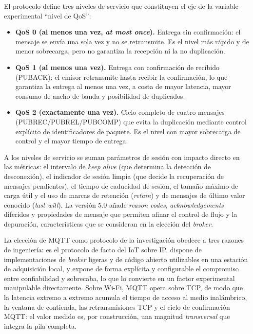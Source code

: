 \documentclass[
  12pt,
]{article}
\providecommand{\tightlist}{%
  \setlength{\itemsep}{0pt}\setlength{\parskip}{0pt}}
\begin{document}
El protocolo define tres niveles de servicio que constituyen el eje de
la variable experimental “nivel de QoS”:

\begin{itemize}
\tightlist
\item
  \textbf{QoS 0 (al menos una vez, \emph{at most once}).} Entrega sin
  confirmación: el mensaje se envía una sola vez y no se retransmite. Es
  el nivel más rápido y de menor sobrecarga, pero no garantiza la
  recepción ni la no duplicación.
\item
  \textbf{QoS 1 (al menos una vez).} Entrega con confirmación de
  recibido (PUBACK): el emisor retransmite hasta recibir la
  confirmación, lo que garantiza la entrega al menos una vez, a costa de
  mayor latencia, mayor consumo de ancho de banda y posibilidad de
  duplicados.
\item
  \textbf{QoS 2 (exactamente una vez).} Ciclo completo de cuatro
  mensajes (PUBREC/PUBREL/PUBCOMP) que evita la duplicación mediante
  control explícito de identificadores de paquete. Es el nivel con mayor
  sobrecarga de control y el mayor tiempo de entrega.
\end{itemize}

A los niveles de servicio se suman parámetros de sesión con impacto
directo en las métricas: el intervalo de \emph{keep alive} (que
determina la detección de desconexión), el indicador de sesión limpia
(que decide la recuperación de mensajes pendientes), el tiempo de
caducidad de sesión, el tamaño máximo de carga útil y el uso de marcas
de retención (\emph{retain}) y de mensajes de último valor conocido
(\emph{last will}). La versión 5.0 añade \emph{reason codes},
\emph{acknowledgements} diferidos y propiedades de mensaje que permiten
afinar el control de flujo y la depuración, características que se
consideran en la elección del \emph{broker}.

La elección de MQTT como protocolo de la investigación obedece a tres
razones de ingeniería: es el protocolo de facto del IoT sobre IP,
dispone de implementaciones de \emph{broker} ligeras y de código abierto
utilizables en una estación de adquisición local, y expone de forma
explícita y configurable el compromiso entre confiabilidad y sobrecaba,
lo que lo convierte en un factor experimental manipulable directamente.
Sobre Wi-Fi, MQTT opera sobre TCP, de modo que la latencia extremo a
extremo acumula el tiempo de acceso al medio inalámbrico, la ventana de
contienda, las retransmisiones TCP y el ciclo de confirmación MQTT: el
valor medido es, por construcción, una magnitud \emph{transversal} que
integra la pila completa.
\end{document}
